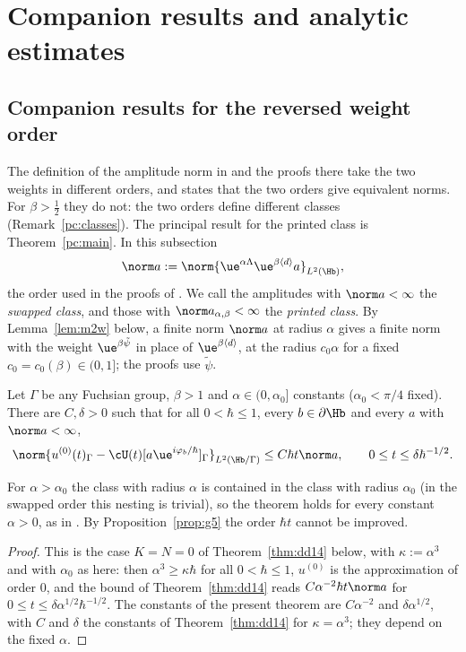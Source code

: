 
\section{Companion results and analytic estimates}\label{sec:dd}

\subsection{Companion results for the reversed weight order}\label{sec:swapped}
The definition of the amplitude norm in \cite{S} and the proofs there take the two weights in different orders, and
\cite[Proposition~7.1]{S} states that the two orders give equivalent norms. For
$\beta>\tfrac12$ they do not: the two orders define different classes (Remark~\ref{pc:classes}). The principal result for the printed class is Theorem~\ref{pc:main}. In this subsection
\[
\norm a:=\norm{\ue^{\alpha\Lambda}\ue^{\beta\langle d\rangle}a}_{L^2(\Hb)} ,
\]
the order used in the proofs of \cite{S}. We call the amplitudes with $\norm a<\infty$ the \emph{swapped class}, and those with
$\norm a_{\alpha,\beta}<\infty$ the \emph{printed class}.
By Lemma~\ref{lem:m2w} below, a finite norm $\norm a$ at radius $\alpha$ gives a finite norm with the weight
$\ue^{\beta\tilde\psi}$ in place of $\ue^{\beta\langle d\rangle}$, at the radius $c_0\alpha$ for a fixed
$c_0=c_0(\beta)\in(0,1]$; the proofs use $\tilde\psi$.
\begin{theoremR}\label{thm:main}
Let $\Gamma$ be any Fuchsian group, $\beta>1$ and $\alpha\in(0,\alpha_0]$ constants ($\alpha_0<\pi/4$ fixed).
There are $C,\delta>0$ such that for all $0<\hbar\le1$, every $b\in\partial\Hb$ and every $a$ with $\norm a<\infty$,
\[
\norm{u^{(0)}(t)_\Gamma-\cU(t)[a\ue^{i\varphi_b/\hbar}]_\Gamma}_{L^2(\Hb/\Gamma)}\le C\hbar t\norm a,\qquad 0\le t\le\delta\hbar^{-1/2}.
\]
\end{theoremR}
For $\alpha>\alpha_0$ the class with radius $\alpha$ is contained in the class with radius $\alpha_0$
(in the swapped order this nesting is trivial), so the theorem holds for every constant $\alpha>0$,
as in \cite{S}. By Proposition~\ref{prop:g5} the order $\hbar t$ cannot be improved.

\begin{proof}
This is the case $K=N=0$ of Theorem~\ref{thm:dd14} below, with $\kappa:=\alpha^3$ and with $\alpha_0$ as here: then
$\alpha^3\ge\kappa\hbar$ for all $0<\hbar\le1$, $u^{(0)}$ is the approximation of order $0$, and the bound of Theorem~\ref{thm:dd14} reads
$C\alpha^{-2}\hbar t\norm a$ for $0\le t\le\delta\alpha^{1/2}\hbar^{-1/2}$. The constants of the present theorem are
$C\alpha^{-2}$ and $\delta\alpha^{1/2}$, with $C$ and $\delta$ the constants of Theorem~\ref{thm:dd14} for $\kappa=\alpha^3$; they depend on the fixed $\alpha$.
\end{proof}

